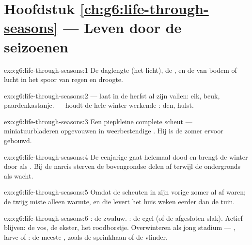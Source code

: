 \section*{Hoofdstuk \ref{ch:g6:life-through-seasons} --- Leven door de seizoenen}

\begin{solution}{exo:g6:life-through-seasons:1}
De daglengte (het licht), de , en de  van bodem of
lucht in het spoor van regen en droogte.
\end{solution}

\begin{solution}{exo:g6:life-through-seasons:2}
 --- laat in de herfst al zijn  vallen: eik, beuk,
paardenkastanje.  --- houdt de hele winter werkende
: den, hulst.
\end{solution}

\begin{solution}{exo:g6:life-through-seasons:3}
Een piepkleine complete scheut --- miniatuurbladeren opgevouwen in
weerbestendige . Hij is de zomer ervoor gebouwd.
\end{solution}

\begin{solution}{exo:g6:life-through-seasons:4}
De eenjarige gaat helemaal dood en brengt de winter door als . Bij de
narcis sterven de bovengrondse delen af terwijl de  ondergronds als
 wacht.
\end{solution}

\begin{solution}{exo:g6:life-through-seasons:5}
Omdat de scheuten in zijn  vorige zomer al af waren; de twijg
miste alleen warmte, en die levert het huis weken eerder dan de tuin.
\end{solution}

\begin{solution}{exo:g6:life-through-seasons:6}
: de zwaluw. : de egel (of de afgesloten slak). Actief
blijven: de vos, de ekster, het roodborstje. Overwinteren als jong
stadium --- , larve of : de meeste , zoals de sprinkhaan of
de vlinder.
\end{solution}

